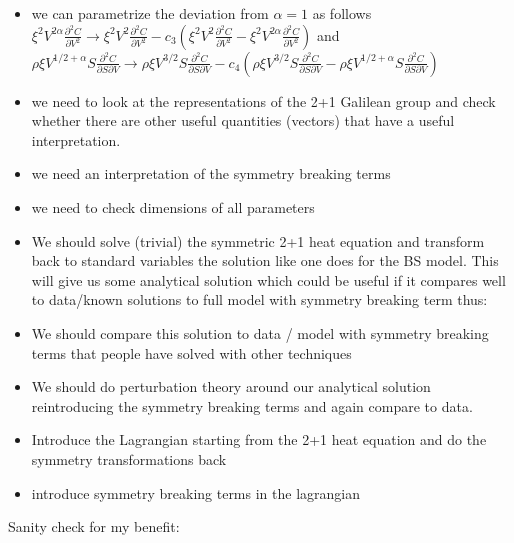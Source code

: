 \documentclass[english,12pt]{article}
\def\to{\rightarrow}
\begin{document}
\begin{itemize}
\item we can parametrize the deviation from $\alpha=1$ as follows
$\xi^2 V^{2 \alpha}  \frac{\partial^2 C}{\partial V^2}\to\xi^2 V^{2}  \frac{\partial^2 C}{\partial V^2}- c_3 (\xi^2 V^{2}  \frac{\partial^2 C}{\partial V^2}-\xi^2 V^{2 \alpha}  \frac{\partial^2 C}{\partial V^2}) $ and $\rho \xi V^{1/2+\alpha} S \frac{\partial^2 C}{\partial S \partial V}\to \rho \xi V^{3/2} S \frac{\partial^2 C}{\partial S \partial V} 
- c_4(\rho \xi V^{3/2} S \frac{\partial^2 C}{\partial S \partial V} -
\rho \xi V^{1/2+\alpha} S \frac{\partial^2 C}{\partial S \partial V}) $ 
\item we need to look at the representations of the 2+1 Galilean group and check whether there are other useful quantities (vectors) that have a useful interpretation.
\item we need an interpretation of the symmetry breaking terms
\item we need to check dimensions of all parameters
\item We should solve (trivial) the symmetric 2+1 heat equation and transform back to standard variables the solution like one does for the BS model. This will give us some analytical solution which could be useful if it compares well to data/known solutions to full model with symmetry breaking term thus:
\item We should compare this solution to data / model with symmetry breaking terms that people have solved with other techniques
\item We should do perturbation theory around our analytical solution reintroducing the symmetry breaking terms and again compare to data.
\item Introduce the Lagrangian starting from the 2+1 heat equation and do the symmetry transformations back
\item introduce symmetry breaking terms in the lagrangian
\end{itemize}




Sanity check for my benefit:
\end{document}
